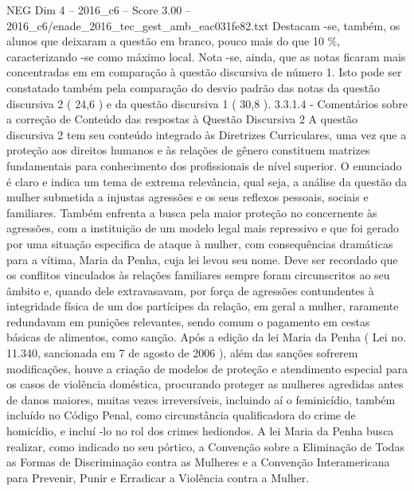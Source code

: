 \begin{textsample}{NEG Dim 4 – 2016\_c6 – Score 3.00 – 2016\_c6/enade\_2016\_tec\_gest\_amb\_eac031fe82.txt}
Destacam -se, também, os alunos que deixaram a questão em branco, pouco mais do que 10 \%, caracterizando -se como máximo local.
Nota -se, ainda, que as notas ficaram mais concentradas em em comparação à questão discursiva de número 1.
Isto pode ser constatado também pela comparação do desvio padrão das notas da questão discursiva 2 ( 24,6 ) e da questão discursiva 1 ( 30,8 ). 3.3.1.4 - Comentários sobre a correção de Conteúdo das respostas à Questão Discursiva 2 A questão discursiva 2 tem seu conteúdo integrado às Diretrizes Curriculares, uma vez que a proteção aos direitos humanos e às relações de gênero constituem matrizes fundamentais para conhecimento dos profissionais de nível superior.
O enunciado é claro e indica um tema de extrema relevância, qual seja, a análise da questão da mulher submetida a injustas agressões e os seus reflexos pessoais, sociais e familiares.
Também enfrenta a busca pela maior proteção no concernente às agressões, com a instituição de um modelo legal mais repressivo e que foi gerado por uma situação especifica de ataque à mulher, com consequências dramáticas para a vítima, Maria da Penha, cuja lei levou seu nome.
Deve ser recordado que os conflitos vinculados às relações familiares sempre foram circunscritos ao seu âmbito e, quando dele extravasavam, por força de agressões contundentes à integridade física de um dos partícipes da relação, em geral a mulher, raramente redundavam em punições relevantes, sendo comum o pagamento em cestas básicas de alimentos, como sanção.
Após a edição da lei Maria da Penha ( Lei no. 11.340, sancionada em 7 de agosto de 2006 ), além das sanções sofrerem modificações, houve a criação de modelos de proteção e atendimento especial para os casos de violência doméstica, procurando proteger as mulheres agredidas antes de danos maiores, muitas vezes irreversíveis, incluindo aí o feminicídio, também incluído no Código Penal, como circunstância qualificadora do crime de homicídio, e incluí -lo no rol dos crimes hediondos.
A lei Maria da Penha busca realizar, como indicado no seu pórtico, a Convenção sobre a Eliminação de Todas as Formas de Discriminação contra as Mulheres e a Convenção Interamericana para Prevenir, Punir e Erradicar a Violência contra a Mulher.

\end{textsample}
